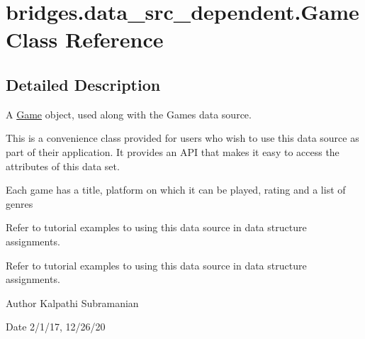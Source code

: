 \hypertarget{classbridges_1_1data__src__dependent_1_1_game}{}\section{bridges.\+data\+\_\+src\+\_\+dependent.\+Game Class Reference}
\label{classbridges_1_1data__src__dependent_1_1_game}


\subsection{Detailed Description}
A \hyperlink{classbridges_1_1data__src__dependent_1_1_game}{Game} object, used along with the Games data source. 

This is a convenience class provided for users who wish to use this data source as part of their application. It provides an A\+PI that makes it easy to access the attributes of this data set.

Each game has a title, platform on which it can be played, rating and a list of genres

Refer to tutorial examples to using this data source in data structure assignments.

Refer to tutorial examples to using this data source in data structure assignments.

\begin{DoxyAuthor}{Author}
Kalpathi Subramanian 
\end{DoxyAuthor}
\begin{DoxyDate}{Date}
2/1/17, 12/26/20 
\end{DoxyDate}
